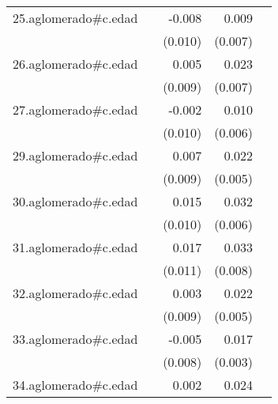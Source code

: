 {\begin{longtable}{l*{4}{D{.}{.}{-1}}}
\addlinespace
25.aglomerado#c.edad&                     &      -0.008         &       0.009         &                     \\
            &                     &     (0.010)         &     (0.007)         &                     \\
\addlinespace
26.aglomerado#c.edad&                     &       0.005         &       0.023\sym{***}&                     \\
            &                     &     (0.009)         &     (0.007)         &                     \\
\addlinespace
27.aglomerado#c.edad&                     &      -0.002         &       0.010         &                     \\
            &                     &     (0.010)         &     (0.006)         &                     \\
\addlinespace
29.aglomerado#c.edad&                     &       0.007         &       0.022\sym{***}&                     \\
            &                     &     (0.009)         &     (0.005)         &                     \\
\addlinespace
30.aglomerado#c.edad&                     &       0.015         &       0.032\sym{***}&                     \\
            &                     &     (0.010)         &     (0.006)         &                     \\
\addlinespace
31.aglomerado#c.edad&                     &       0.017         &       0.033\sym{***}&                     \\
            &                     &     (0.011)         &     (0.008)         &                     \\
\addlinespace
32.aglomerado#c.edad&                     &       0.003         &       0.022\sym{***}&                     \\
            &                     &     (0.009)         &     (0.005)         &                     \\
\addlinespace
33.aglomerado#c.edad&                     &      -0.005         &       0.017\sym{***}&                     \\
            &                     &     (0.008)         &     (0.003)         &                     \\
\addlinespace
34.aglomerado#c.edad&                     &       0.002         &       0.024\sym{***}&                     \\

\end{longtable}}
